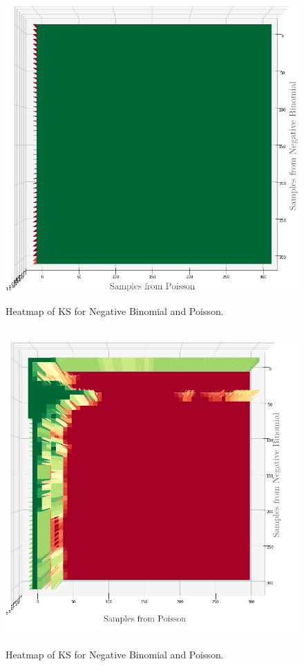 \begin{figure}[h]
  \centering
  \includegraphics[width=\linewidth]{./img/hypothesis_test/deepar_X_poisson_Y_neg_bin_naive_edited.png}
  \caption{Heatmap of KS for Negative Binomial and Poisson.}
  \label{naive_negative_bin_poisson}
  \endminipage
  \\
  \includegraphics[width=\linewidth]{./img/hypothesis_test/deepar_heatmap_Y_neg_bin_X_poisson_ks_edited_labels.png}
  \caption{Heatmap of KS for Negative Binomial and Poisson.}
  \label{ks_neg_bin_poisson}
  \endminipage
\end{figure}

